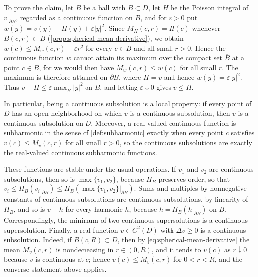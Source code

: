 To prove the claim, let $B$ be a ball with $\overline B\subset D$, let $H$ be the Poisson integral of $v|_{\partial B}$, regarded as a continuous function on $\overline B$, and for $\varepsilon>0$ put $w(y)=v(y)-H(y)+\varepsilon|y|^2$. Since $M_H(c,r)=H(c)$ whenever $\overline{B(c,r)}\subset B$ (\cref{prop:spherical-mean-derivative}), we obtain $w(c)\leq M_w(c,r)-\varepsilon r^2$ for every $c\in B$ and all small $r>0$. Hence the continuous function $w$ cannot attain its maximum over the compact set $\overline B$ at a point $c\in B$, for we would then have $M_w(c,r)\leq w(c)$ for all small $r$. The maximum is therefore attained on $\partial B$, where $H=v$ and hence $w(y)=\varepsilon|y|^2$. Thus $v-H\leq\varepsilon\max_{\overline B}|y|^2$ on $B$, and letting $\varepsilon\downarrow0$ gives $v\leq H$.

In particular, being a continuous subsolution is a local property: if every point of $D$ has an open neighborhood on which $v$ is a continuous subsolution, then $v$ is a continuous subsolution on $D$. Moreover, a real-valued continuous function is subharmonic in the sense of \cref{def:subharmonic} exactly when every point $c$ satisfies $v(c)\leq M_v(c,r)$ for all small $r>0$, so the continuous subsolutions are exactly the real-valued continuous subharmonic functions.

These functions are stable under the usual operations. If $v_1$ and $v_2$ are continuous subsolutions, then so is $\max\{v_1,v_2\}$, because $H_B$ preserves order, so that $v_i\leq H_B(v_i|_{\partial B})\leq H_B(\max\{v_1,v_2\}|_{\partial B})$. Sums and multiples by nonnegative constants of continuous subsolutions are continuous subsolutions, by linearity of $H_B$, and so is $v-h$ for every harmonic $h$, because $h=H_B(h|_{\partial B})$ on $B$. Correspondingly, the minimum of two continuous supersolutions is a continuous supersolution. Finally, a real function $v\in C^2(D)$ with $\Delta v\geq0$ is a continuous subsolution. Indeed, if $\overline{B(c,R)}\subset D$, then by \eqref{eq:spherical-mean-derivative} the mean $M_v(c,r)$ is nondecreasing in $r\in(0,R)$, and it tends to $v(c)$ as $r\downarrow0$ because $v$ is continuous at $c$; hence $v(c)\leq M_v(c,r)$ for $0<r<R$, and the converse statement above applies.

